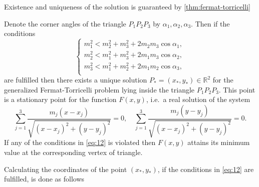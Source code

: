 Existence and uniqueness of the solution is guaranteed by
\cref{thm:fermat-torricelli}
%
\begin{theorem}
\label{thm:fermat-torricelli}
  Denote the corner angles of the triangle $P_1 P_2 P_3$ by $\alpha_1, \alpha_2,
  \alpha_3$. Then if the conditions
  \begin{equation}
    \label{eq:12}
    \left\{
      \begin{array}{c}
        m_1^2 < m_2^2 + m_3^2 + 2 m_2 m_3 \cos \alpha_1 , \\
        m_2^2 < m_1^2 + m_3^2 + 2 m_1 m_3 \cos \alpha_2 , \\
        m_3^2 < m_1^2 + m_2^2 + 2 m_1 m_2 \cos \alpha_3 , \\
      \end{array}
    \right.
  \end{equation}
  are fulfilled then there exists a unique solution $P_\ast = (x_\ast, y_\ast)
  \in \mathbb{R}^2$ for the generalized Fermat-Torricelli problem lying inside
  the triangle $P_1 P_2 P_3$.  This point is a stationary point for the function
  $F(x,y)$, i.e.\ a real solution of the system
  \begin{equation}
    \label{eq:13}
    \sum_{j=1}^3 \frac{m_j(x-x_j)}{\sqrt{{(x-x_j)}^2 + {(y - y_j)}^2}} = 0, \quad
    \sum_{j=1}^3 \frac{m_j(y-y_j)}{\sqrt{{(x-x_j)}^2 + {(y - y_j)}^2}} = 0.
  \end{equation}
  If any of the conditions in \cref{eq:12} is violated then $F(x,y)$ attains its
  minimum value at the corresponding vertex of triangle.
\end{theorem}
%
Calculating the coordinates of the point $(x_\ast, y_\ast)$, if the conditions
in \cref{eq:12} are fulfilled, is done as follows
